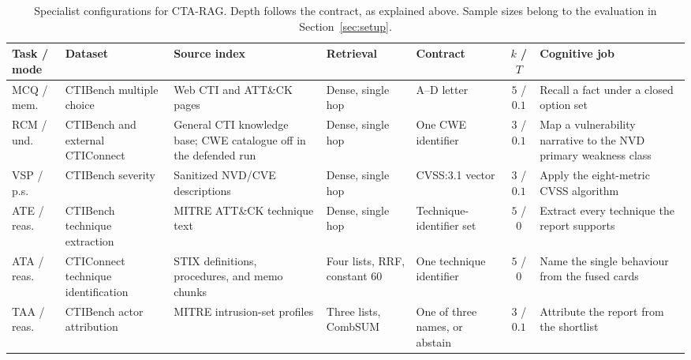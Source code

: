 \documentclass[5p,times,authoryear]{elsarticle}
\begin{document}
\begin{table}[!htbp]
\centering
\caption{Specialist configurations for CTA-RAG. Depth follows the contract, as explained above. Sample sizes belong to the evaluation in Section~\ref{sec:setup}.}
\label{tab:pipe-config}
\footnotesize
\setlength{\tabcolsep}{3pt}
\begin{tabular}{@{}>{\raggedright\arraybackslash}p{}>{\raggedright\arraybackslash}p{}>{\raggedright\arraybackslash}p{}>{\raggedright\arraybackslash}p{}>{\raggedright\arraybackslash}p{}c>{\raggedright\arraybackslash}p{}@{}}
\toprule
Task / mode & Dataset & Source index & Retrieval & Contract & $k$ / $T$ & Cognitive job \\
\midrule
MCQ / mem. & CTIBench multiple choice & Web CTI and ATT\&CK pages & Dense, single hop & A--D letter & $5$ / $0.1$ & Recall a fact under a closed option set \\
RCM / und. & CTIBench and external CTIConnect & General CTI knowledge base; CWE catalogue off in the defended run & Dense, single hop & One CWE identifier & $3$ / $0.1$ & Map a vulnerability narrative to the NVD primary weakness class \\
VSP / p.s. & CTIBench severity & Sanitized NVD/CVE descriptions & Dense, single hop & CVSS:3.1 vector & $3$ / $0.1$ & Apply the eight-metric CVSS algorithm \citep{first2024cvss} \\
ATE / reas. & CTIBench technique extraction & MITRE ATT\&CK technique text & Dense, single hop & Technique-identifier set & $5$ / $0$ & Extract every technique the report supports \\
ATA / reas. & CTIConnect technique identification & STIX definitions, procedures, and memo chunks & Four lists, RRF, constant $60$ & One technique identifier & $5$ / $0$ & Name the single behaviour from the fused cards \\
TAA / reas. & CTIBench actor attribution & MITRE intrusion-set profiles & Three lists, CombSUM & One of three names, or abstain & $3$ / $0.1$ & Attribute the report from the shortlist \\
\bottomrule
\end{tabular}
\end{table}
\end{document}
